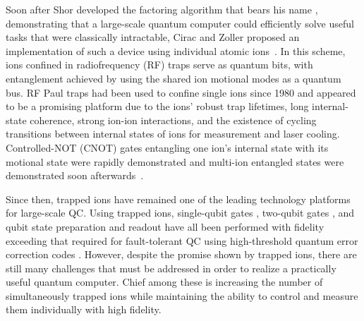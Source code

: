 \documentclass[%
12pt,
 amsmath,amssymb,
]{revtex4-2}
\begin{document}
Soon after Shor developed the factoring algorithm that bears his name \cite{ShorAlgorithm}, demonstrating that a large-scale quantum computer could efficiently solve useful tasks that were classically intractable, Cirac and Zoller proposed an implementation of such a device using individual atomic ions~\cite{CiracZollerGate}.  In this scheme, ions confined in radiofrequency (RF) traps serve as quantum bits, with entanglement achieved by using the shared ion motional modes as a quantum bus. RF Paul traps had been used to confine single ions since 1980 \cite{NeuhauserTrappedIon1980} and appeared to be a promising platform due to the ions' robust trap lifetimes, long internal-state coherence, strong ion-ion interactions, and the existence of cycling transitions between internal states of ions for measurement and laser cooling. Controlled-NOT (CNOT) gates entangling one ion's internal state with its motional state were rapidly demonstrated \cite{MonroeCNOT1995} and multi-ion entangled states were demonstrated soon afterwards~\cite{TurchetteEntanglement1998, Sackett4IonEntanglement2000}.

Since then, trapped ions have remained one of the leading technology platforms for large-scale QC. Using trapped ions, single-qubit gates \cite{NIST:HifiMicrogate:12}, two-qubit gates \cite{BenhelmMSGate2008}, and qubit state preparation and readout \cite{MyersonReadoutIons2008} have all been performed with fidelity exceeding that required for fault-tolerant QC using high-threshold quantum error correction codes \cite{RaussendorfSurfaceCode2007}.  However, despite the promise shown by trapped ions, there are still many challenges that must be addressed in order to realize a practically useful quantum computer.  Chief among these is increasing the number of simultaneously trapped ions while maintaining the ability to control and measure them individually with high fidelity.

\end{document}
